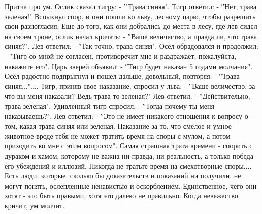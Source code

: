 \obeycr
Притча про ум.
Ослик сказал тигру:
- ′"Трава синяя".
Тигр ответил:
- ′′Нет, трава зеленая!"
Вспыхнул спор, и они пошли ко льву, лесному царю, чтобы разрешить свои разногласия. Еще до того, как они добрались до места в лесу, где лев сидел на своем троне, ослик начал кричать:
- ′′Ваше величество, а правда ли, что трава синяя?".
Лев ответил:
- ′′Так точно, трава синяя".
Осёл обрадовался и продолжил:
- ′′Тигр со мной не согласен, противоречит мне и раздражает, пожалуйста, накажите его".
Царь зверей объявил:
- ′′Тигр будет наказан 5 годами молчания".
Осёл радостно подпрыгнул и пошел дальше, довольный, повторяя:
- ′′Трава синяя..."....
Тигр, приняв свое наказание, спросил у льва:
- ′′Ваше величество, за что вы меня наказали? Ведь трава-то зеленая?"
Лев ответил:
- ′′Действительно, трава зеленая".
Удивленный тигр спросил:
- ′′Тогда почему ты меня наказываешь?".
Лев ответил:
- ′′Это не имеет никакого отношения к вопросу о том, какая трава синяя или
зеленая. Наказание за то, что смелое и умное животное вроде тебя не может
тратить время на споры с мулом, а потом приходить ко мне с этим вопросом".
Самая страшная трата времени - спорить с дураком и хамом, которому не важна ни
правда, ни реальность, а только победа его убеждений и иллюзий. Никогда не
тратьте время на смехотворные споры.... Есть люди, которые, сколько бы
доказательств и показаний ни получили, не могут понять, ослепленные ненавистью
и оскорблением. Единственное, чего они хотят - это быть правыми, хотя это
далеко не правильно.
Когда невежество кричит, ум молчит.
\restorecr

